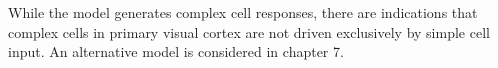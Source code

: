 
\begin{rem}
   While the model generates complex cell responses, there are indications that complex cells in primary visual cortex are not driven exclusively by simple cell input. An alternative model is considered in chapter 7.
\end{rem}

